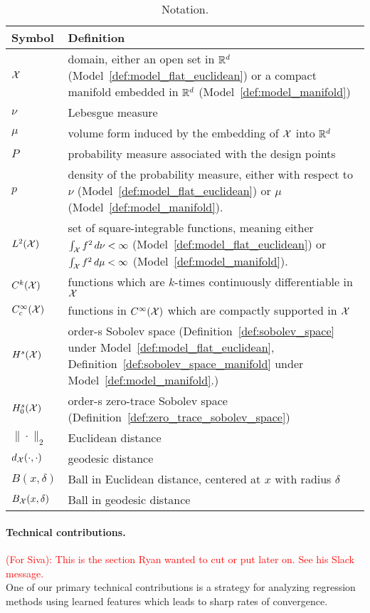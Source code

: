 \begin{table}[p]
	\begin{center}
		\begin{tabular}{p{} | p{} }
		Symbol & Definition
		\\
		\hline
		$\mathcal{X}$ & domain, either an open set in $\mathbb{R}^d$ (Model~\ref{def:model_flat_euclidean}) or a compact manifold embedded in $\mathbb{R}^d$ (Model~\ref{def:model_manifold}) \\
		$\nu$ & Lebesgue measure \\
		$\mu$ & volume form induced by the embedding of $\mathcal{X}$ into $\mathbb{R}^d$ \\
		$P$ & probability measure associated with the design points \\
		$p$ & density of the probability measure, either with respect to $\nu$ (Model~\ref{def:model_flat_euclidean}) or $\mu$ (Model~\ref{def:model_manifold}). \\
		$L^2(\mathcal{X})$ & set of square-integrable functions, meaning either $\int_{\mathcal{X}} f^2 \,d\nu < \infty$ (Model~\ref{def:model_flat_euclidean}) or $\int_{\mathcal{X}} f^2 \,d\mu < \infty$ (Model~\ref{def:model_manifold}). \\
		$C^k(\mathcal{X})$ & functions which are $k$-times continuously differentiable in $\mathcal{X}$ \\
		$C_c^{\infty}(\mathcal{X})$ & functions in $C^{\infty}(\mathcal{X})$ which are compactly supported in $\mathcal{X}$ \\
		$H^s(\mathcal{X})$ & order-s Sobolev space (Definition~\ref{def:sobolev_space} under Model~\ref{def:model_flat_euclidean}, Definition~\ref{def:sobolev_space_manifold} under Model~\ref{def:model_manifold}.) \\
		$H_0^s(\mathcal{X})$ & order-s zero-trace Sobolev space (Definition~\ref{def:zero_trace_sobolev_space}) \\
		$\|\cdot\|_2$ & Euclidean distance \\
		$d_{\mathcal{X}}(\cdot,\cdot)$ & geodesic distance \\
		$B(x,\delta)$ & Ball in Euclidean distance, centered at $x$ with radius $\delta$ \\
		$B_{\mathcal{X}}(x,\delta)$ & Ball in geodesic distance
		\end{tabular}
	\end{center}
	\caption{Notation.}
\end{table}

\paragraph{Technical contributions.}
\textcolor{red}{(For Siva): This is the section Ryan wanted to cut or put later on. See his Slack message.} \\
One of our primary technical contributions is a strategy for analyzing regression methods using learned features which leads to sharp rates of convergence. 


